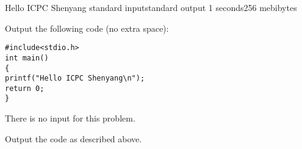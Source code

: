 \begin{problem}{Hello ICPC Shenyang}
{standard input}{standard output}
{1 seconds}{256 mebibytes}{}

Output the following code (no extra space):

\begin{verbatim}
#include<stdio.h>
int main()
{
printf("Hello ICPC Shenyang\n");
return 0;
}
\end{verbatim}

\InputFile

There is no input for this problem.

\OutputFile

Output the code as described above.

\Examples

\begin{example}
%
\end{example}


\end{problem}
